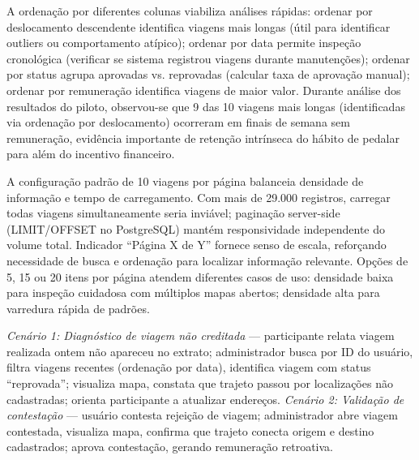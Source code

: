 A ordenação por diferentes colunas viabiliza análises rápidas: ordenar por deslocamento descendente identifica viagens mais longas (útil para identificar outliers ou comportamento atípico); ordenar por data permite inspeção cronológica (verificar se sistema registrou viagens durante manutenções); ordenar por status agrupa aprovadas vs. reprovadas (calcular taxa de aprovação manual); ordenar por remuneração identifica viagens de maior valor. Durante análise dos resultados do piloto, observou-se que 9 das 10 viagens mais longas (identificadas via ordenação por deslocamento) ocorreram em finais de semana sem remuneração, evidência importante de retenção intrínseca do hábito de pedalar para além do incentivo financeiro.

A configuração padrão de 10 viagens por página balanceia densidade de informação e tempo de carregamento. Com mais de 29.000 registros, carregar todas viagens simultaneamente seria inviável; paginação server-side (LIMIT/OFFSET no PostgreSQL) mantém responsividade independente do volume total. Indicador ``Página X de Y'' fornece senso de escala, reforçando necessidade de busca e ordenação para localizar informação relevante. Opções de 5, 15 ou 20 itens por página atendem diferentes casos de uso: densidade baixa para inspeção cuidadosa com múltiplos mapas abertos; densidade alta para varredura rápida de padrões.

\textit{Cenário 1: Diagnóstico de viagem não creditada} --- participante relata viagem realizada ontem não apareceu no extrato; administrador busca por ID do usuário, filtra viagens recentes (ordenação por data), identifica viagem com status ``reprovada''; visualiza mapa, constata que trajeto passou por localizações não cadastradas; orienta participante a atualizar endereços. \textit{Cenário 2: Validação de contestação} --- usuário contesta rejeição de viagem; administrador abre viagem contestada, visualiza mapa, confirma que trajeto conecta origem e destino cadastrados; aprova contestação, gerando remuneração retroativa.


